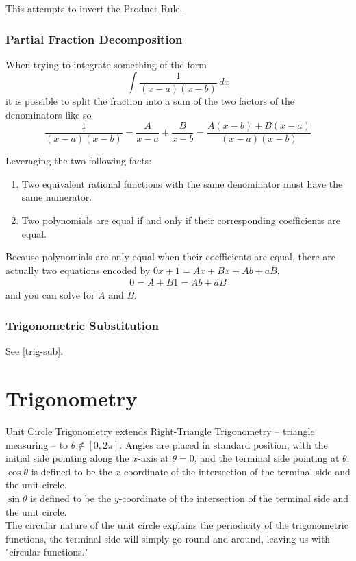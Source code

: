 \documentclass{article}
\begin{document}
This attempts to invert the Product Rule.

\subsubsection{Partial Fraction Decomposition}
When trying to integrate something of the form
$$\int\frac{1}{(x-a)(x-b)}\,dx$$
it is possible to split the fraction into a sum of the two factors of the denominators like so
$$\frac{1}{(x-a)(x-b)}=\frac{A}{x-a}+\frac{B}{x-b}=\frac{A(x-b)+B(x-a)}{(x-a)(x-b)}$$

Leveraging the two following facts:
\begin{enumerate}
    \item Two equivalent rational functions with the same denominator must have the same numerator.
    \item Two polynomials are equal if and only if their corresponding coefficients are equal.
\end{enumerate}
Because polynomials are only equal when their coefficients are equal, there are actually two equations encoded by $0x+1=Ax+Bx+Ab+aB$,
\begin{align*}
    0=A+B
    1=Ab+aB
\end{align*}
and you can solve for $A$ and $B$.

\subsubsection{Trigonometric Substitution}
See \ref{trig-sub}.

\section{Trigonometry}
Unit Circle Trigonometry extends Right-Triangle Trigonometry -- triangle measuring -- to $\theta \notin [0, 2\pi]$.
Angles are placed in standard position, with the initial side pointing along the $x$-axis at $\theta=0$, and the terminal side pointing at $\theta$.\\
$\cos{\theta}$ is defined to be the $x$-coordinate of the intersection of the terminal side and the unit circle.\\
$\sin{\theta}$ is defined to be the $y$-coordinate of the intersection of the terminal side and the unit circle.\\

The circular nature of the unit circle explains the periodicity of the trigonometric functions, the terminal side will simply go round and around, leaving us with "circular functions."
\end{document}
